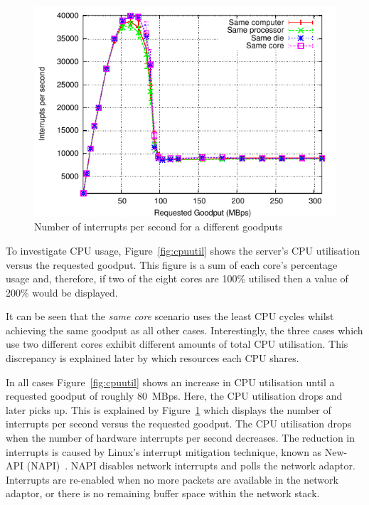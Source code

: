 \documentclass[conference, compsoc]{IEEEtran}
\begin{document}
\begin{figure}[tb]
    \begin{center}
        \includegraphics[height=0.65\columnwidth]{Graphs/intel/two_machines/requested_goodput_vs_intrpers}
    \end{center}
    \caption{Number of interrupts per second for a different goodputs}
    \label{fig:interruptspersecond}
\end{figure}

To investigate CPU usage, Figure~\ref{fig:cpuutil} shows the server's CPU utilisation versus the requested goodput. This figure is a sum of each core's percentage usage and, therefore, if two of the eight cores are 100\% utilised then a value of 200\% would be displayed.

It can be seen that the \emph{same core} scenario uses the least CPU cycles whilst achieving the same goodput as all other cases. Interestingly, the three cases which use two different cores exhibit different amounts of total CPU utilisation. This discrepancy is explained later by which resources each CPU shares.

In all cases Figure~\ref{fig:cpuutil} shows an increase in CPU utilisation until a requested goodput of roughly 80~MBps. Here, the CPU utilisation drops and later picks up. This is explained by Figure~\ref{fig:interruptspersecond} which displays the number of interrupts per second versus the requested goodput. The CPU utilisation drops when the number of hardware interrupts per second decreases. The reduction in interrupts is caused by Linux's interrupt mitigation technique, known as New-API (NAPI)~\cite{1268506}. NAPI disables network interrupts and polls the network adaptor. Interrupts are re-enabled when no more packets are available in the network adaptor, or there is no remaining buffer space within the network stack.
\end{document}
